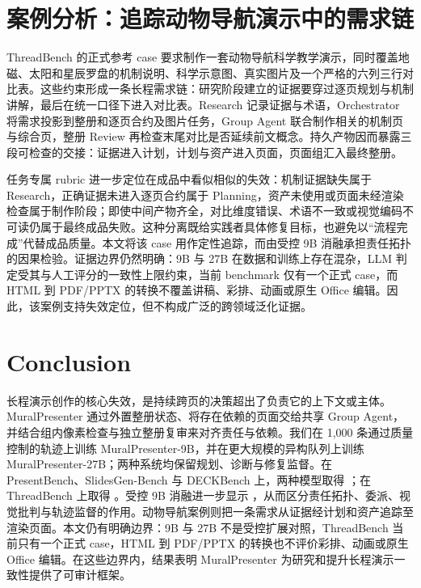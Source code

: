 
\section{案例分析：追踪动物导航演示中的需求链}

ThreadBench 的正式参考 case 要求制作一套动物导航科学教学演示，同时覆盖地磁、太阳和星辰罗盘的机制说明、科学示意图、真实图片及一个严格的六列三行对比表。这些约束形成一条长程需求链：研究阶段建立的证据要穿过逐页规划与机制讲解，最后在统一口径下进入对比表。Research 记录证据与术语，Orchestrator 将需求投影到整册和逐页合约及图片任务，Group Agent 联合制作相关的机制页与综合页，整册 Review 再检查末尾对比是否延续前文概念。持久产物因而暴露三段可检查的交接：证据进入计划，计划与资产进入页面，页面组汇入最终整册。

任务专属 rubric 进一步定位在成品中看似相似的失效：机制证据缺失属于 Research，正确证据未进入逐页合约属于 Planning，资产未使用或页面未经渲染检查属于制作阶段；即使中间产物齐全，对比维度错误、术语不一致或视觉编码不可读仍属于最终成品失败。这种分离既给实践者具体修复目标，也避免以“流程完成”代替成品质量。本文将该 case 用作定性追踪，而由受控 9B 消融承担责任拓扑的因果检验。证据边界仍然明确：9B 与 27B 在数据和训练上存在混杂，LLM 判定受其与人工评分的一致性上限约束，当前 benchmark 仅有一个正式 case，而 HTML 到 PDF/PPTX 的转换不覆盖讲稿、彩排、动画或原生 Office 编辑。因此，该案例支持失效定位，但不构成广泛的跨领域泛化证据。

\section{Conclusion}

长程演示创作的核心失效，是持续跨页的决策超出了负责它的上下文或主体。MuralPresenter 通过外置整册状态、将存在依赖的页面交给共享 Group Agent，并结合组内像素检查与独立整册复审来对齐责任与依赖。我们在 1,000 条通过质量控制的轨迹上训练 MuralPresenter-9B，并在更大规模的异构队列上训练 MuralPresenter-27B；两种系统均保留规划、诊断与修复监督。在 PresentBench、SlidesGen-Bench 与 DECKBench 上，两种模型取得 ；在 ThreadBench 上取得 。受控 9B 消融进一步显示 ，从而区分责任拓扑、委派、视觉批判与轨迹监督的作用。动物导航案例则把一条需求从证据经计划和资产追踪至渲染页面。本文仍有明确边界：9B 与 27B 不是受控扩展对照，ThreadBench 当前只有一个正式 case，HTML 到 PDF/PPTX 的转换也不评价彩排、动画或原生 Office 编辑。在这些边界内，结果表明 MuralPresenter 为研究和提升长程演示一致性提供了可审计框架。
